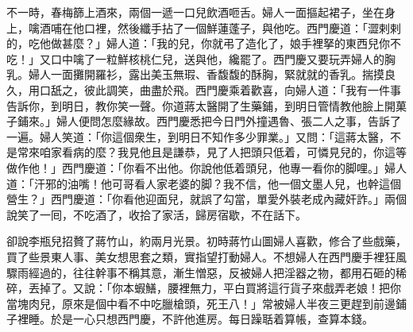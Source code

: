 不一時，春梅篩上酒來，兩個一遞一口兒飲酒咂舌。婦人一面摳起裙子，坐在身上，噙酒哺在他口裡，然後纖手拈了一個鮮蓮蓬子，{}與他吃。西門慶道：「澀剌剌的，{}吃他做甚麼？」婦人道：「我的兒，你就弔了造化了，娘手裡拏的東西兒你不吃！」又口中噙了一粒鮮核桃仁兒，{}送與他，纔罷了。西門慶又要玩弄婦人的胸乳。婦人一面攤開羅衫，露出美玉無瑕、香馥馥的酥胸，緊就就的香乳。揣摸良久，用口舐之，彼此調笑，曲盡於飛。西門慶乘着歡喜，向婦人道：「我有一件事告訴你，到明日，教你笑一聲。你道蔣太醫開了生藥鋪，到明日管情教他臉上開菓子鋪來。」婦人便問怎麼緣故。西門慶悉把今日門外撞遇魯、張二人之事，告訴了一遍。婦人笑道：「你這個衆生，到明日不知作多少罪業。」又問：「這蔣太醫，不是常來咱家看病的麼？我見他且是謙恭，見了人把頭只低着，可憐見兒的，你這等做作他！」西門慶道：「你看不出他。你說他低着頭兒，他專一看你的脚哩。」婦人道：「汗邪的油嘴！他可哥看人家老婆的脚？我不信，他一個文墨人兒，{}也幹這個營生？」{}西門慶道：「你看他迎面兒，就誤了勾當，單愛外裝老成內藏奸詐。」兩個說笑了一囘，不吃酒了，收拾了家活，歸房宿歇，不在話下。

卻說李瓶兒招贅了蔣竹山，約兩月光景。初時蔣竹山圖婦人喜歡，修合了些戲藥，買了些景東人事、美女想思套之類，實指望打動婦人。不想婦人在西門慶手裡狂風驟雨經過的，往往幹事不稱其意，漸生憎惡，反被婦人把淫器之物，都用石砸的稀碎，丟掉了。{}又說：「你本蝦鱔，腰裡無力，{}平白買將這行貨子來戲弄老娘！把你當塊肉兒，原來是個中看不中吃臘槍頭，死王八！」常被婦人半夜三更趕到前邊鋪子裡睡。於是一心只想西門慶，不許他進房。每日躁聒着算帳，查算本錢。

